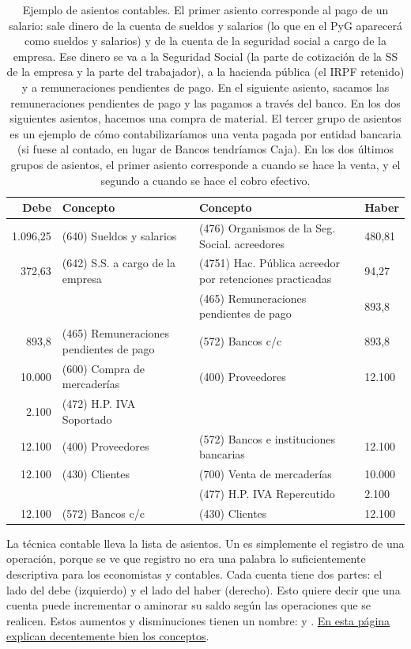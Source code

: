 \documentclass[nochap,palatino,shortheader]{apuntes}
\begin{document}
\begin{table}[hbtp]
\centering
\begin{tabular}{r|p{5cm}||p{5cm}|l}
\textbf{Debe} & \textbf{Concepto} & \textbf{Concepto} & \textbf{Haber} \\ \toprule
1.096,25 & (640) Sueldos y salarios & (476) Organismos de la Seg. Social. acreedores & 480,81 \\
372,63 & (642) S.S. a cargo de la empresa & (4751) Hac. Pública acreedor por retenciones practicadas & 94,27 \\
 & & (465) Remuneraciones pendientes de pago & 893,8 \\ \midrule
 893,8 & (465) Remuneraciones pendientes de pago & (572) Bancos c/c & 893,8 \\ \midrule \midrule
10.000 	& (600) Compra de mercaderías & (400) Proveedores &	12.100 \\
2.100 	& (472) H.P. IVA Soportado & &  \\ \midrule
12.100 	& (400) Proveedores & (572) Bancos e instituciones bancarias &	12.100 \\ \midrule \midrule
12.100 	& (430) Clientes & 	 (700) Venta de mercaderías & 10.000 \\
 & & (477) H.P. IVA Repercutido & 2.100 \\ \midrule
12.100 & (572) Bancos c/c & (430) Clientes & 12.100 \\
 \bottomrule
\end{tabular}
\caption{Ejemplo de asientos contables. El primer asiento corresponde al pago de un salario: sale dinero de la cuenta de sueldos y salarios (lo que en el PyG aparecerá como sueldos y salarios) y de la cuenta de la seguridad social a cargo de la empresa. Ese dinero se va a la Seguridad Social (la parte de cotización de la SS de la empresa y la parte del trabajador), a la hacienda pública (el IRPF retenido) y a remuneraciones pendientes de pago. En el siguiente asiento, sacamos las remuneraciones pendientes de pago y las pagamos a través del banco. En los dos siguientes asientos, hacemos una compra de material. El tercer grupo de asientos es un ejemplo de cómo contabilizaríamos una venta pagada por entidad bancaria (si fuese al contado, en lugar de Bancos tendríamos Caja). En los dos últimos grupos de asientos, el primer asiento corresponde a cuando se hace la venta, y el segundo a cuando se hace el cobro efectivo.}
\label{tab:Asientos}
\end{table}

La técnica contable lleva la lista de asientos. Un  es simplemente el registro de una operación, porque se ve que registro no era una palabra lo suficientemente descriptiva para los economistas y contables. Cada cuenta tiene dos partes: el lado del debe (izquierdo) y el lado del haber (derecho). Esto quiere decir que una cuenta puede incrementar o aminorar su saldo según las operaciones que se realicen. Estos aumentos y disminuciones tienen un nombre:  y . \href{http://www.plangeneralcontable.com/?tit=guia-de-contabilidad-para-torpes&name=GeTia&contentId=man_ctorpes&manPage=8}{En esta página explican decentemente bien los conceptos}.
\end{document}
